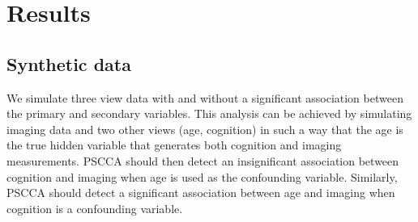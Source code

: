 \documentclass{llncs}
\begin{document}
\section{Results}
\subsection{Synthetic data}
We simulate three view data with and without a significant association
between the primary and secondary variables.  This analysis can be
achieved by simulating imaging data and two other views (age,
cognition) in such a way that the age is the true hidden variable that
generates both cognition and imaging measurements.  PSCCA should then
detect an insignificant association between cognition and imaging when
age is used as the confounding variable.  Similarly, PSCCA should
detect a significant association between age and imaging when
cognition is a confounding variable.   
\end{document}
